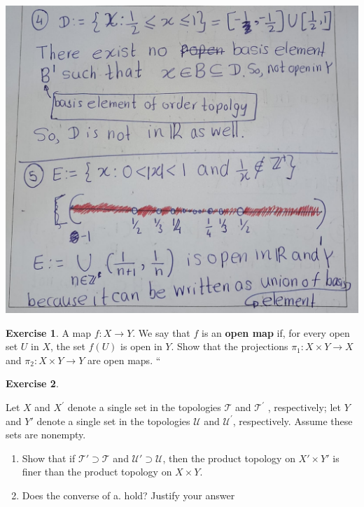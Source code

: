 \documentclass[
]{book}
\providecommand{\tightlist}{%
  \setlength{\itemsep}{0pt}\setlength{\parskip}{0pt}}
\theoremstyle{definition}
\theoremstyle{definition}
\theoremstyle{definition}
\newtheorem{exercise}{Exercise}[chapter]
\theoremstyle{definition}
\theoremstyle{remark}
\begin{document}
\includegraphics{figures/Exercises/Ex 2.16/ex 3-2.jpg}

\begin{exercise}
\protect\hypertarget{exr:unnamed-chunk-89}{}\label{exr:unnamed-chunk-89}A map \(f : X \to Y\). We say that \(f\) is an \textbf{open map} if, for every open set \(U\) in \(X\), the set \(f(U)\) is open in \(Y\). Show that the projections \(\pi_1 : X \times Y \to X\) and \(\pi_2 : X \times Y \to Y\) are open maps.
``
\end{exercise}

\begin{exercise}
\protect\hypertarget{exr:unnamed-chunk-90}{}\label{exr:unnamed-chunk-90}

Let \(X\) and \(X^\prime\) denote a single set in the topologies \(\mathcal{T}\) and \(\mathcal{T}^\prime\) , respectively; let \(Y\)
and \(Y'\) denote a single set in the topologies \(\mathcal{U}\) and \(\mathcal{U}^\prime\), respectively. Assume these sets are nonempty.

\begin{enumerate}
\def\labelenumi{(\alph{enumi})}
\tightlist
\item
  Show that if \(\mathcal{T}' \supset \mathcal{T}\) and \(\mathcal{U}'\supset \mathcal{U}\), then the product topology on \(X'\times Y'\) is
  finer than the product topology on \(X \times Y\).
\item
  Does the converse of a. hold? Justify your answer
\end{enumerate}

\end{exercise}
\end{document}
